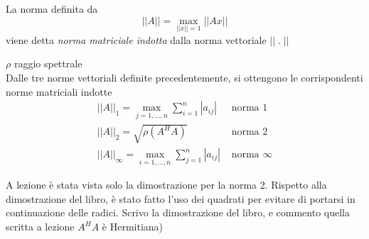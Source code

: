 \begin{defn}
 La norma definita da
 $$ ||A|| = \displaystyle \max_{||x||=1} ||Ax||$$
viene detta \emph{norma matriciale indotta} dalla norma vettoriale $||\; . \;||$
\end{defn}

\begin{theo}
$\rho$ raggio spettrale  \\
Dalle tre norme vettoriali definite precedentemente, si ottengono
le corrispondenti norme matriciali indotte
$$
\begin{array}{ll}
 || A ||_{1} = \displaystyle \max_{j=1, \ldots, n} \displaystyle \sum_{i=1}^{n}|a_{ij}|
    & \text{ norma } 1 \\
 || A ||_{2} =  \sqrt{\rho(A^H A)} &
  \text{ norma } 2 \\
 || A ||_{\infty}  =  \displaystyle \max_{i=1,\ldots, n} \displaystyle \sum_{j=1}^{n}|a_{ij}| 
& \text{ norma } \infty
\end{array}
$$
\end{theo}
\begin{notes}
 A lezione \`e stata vista solo la dimostrazione per la norma 2.
 Rispetto alla dimostrazione del libro, \`e stato fatto l'uso dei
quadrati per evitare di portarsi in continuazione delle radici.
 Scrivo la dimostrazione del libro, e commento quella scritta a
lezione
$A^{H}A$ \`e Hermitiana)
% 
\end{notes}

